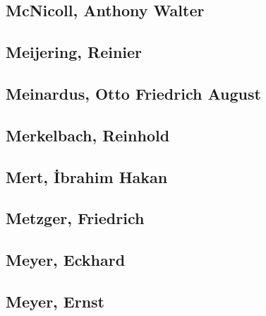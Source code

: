 \subsection[McNicoll, Anthony Walter (1)]{McNicoll, Anthony Walter}

\subsection[Meijering, Reinier (1)]{Meijering, Reinier}

\subsection[Meinardus, Otto Friedrich August (1)]{Meinardus, Otto Friedrich August}

\subsection[Merkelbach, Reinhold (3)]{Merkelbach, Reinhold}



\subsection[Mert, İbrahim Hakan (1)]{Mert, İbrahim Hakan}

\subsection[Metzger, Friedrich (1)]{Metzger, Friedrich}

\subsection[Meyer, Eckhard (1)]{Meyer, Eckhard}

\subsection[Meyer, Ernst (1)]{Meyer, Ernst}

